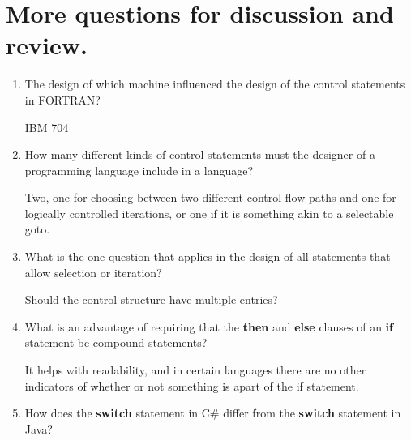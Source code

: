 \section{More questions for discussion and review.}

\begin{enumerate}
  \item The design of which machine influenced the design
    of the control statements in FORTRAN?

    \begin{answer}

    IBM 704

    \end{answer}

  \item How many different kinds of control statements
    must the designer of a programming language include
    in a language?

    \begin{answer}

    Two, one for choosing between two different control flow paths and one for logically controlled iterations, or one if it is something akin to a selectable goto.
    
    \end{answer}

  \item What is the one question that applies in the
    design of all statements that allow selection or
    iteration?

    \begin{answer}
    Should the control structure have multiple entries?
    \end{answer}

  \item What is an advantage of requiring that
    the \textbf{then} and \textbf{else} clauses of
    an \textbf{if} statement be compound statements?

    \begin{answer}

    It helps with readability, and in certain languages there are no other indicators of whether or not something is apart of the if statement.
    
    \end{answer}

  \item How does the \textbf{switch} statement in C\#
    differ from the \textbf{switch} statement in Java?

    \begin{answer}


\end{answer}
\end{enumerate}
